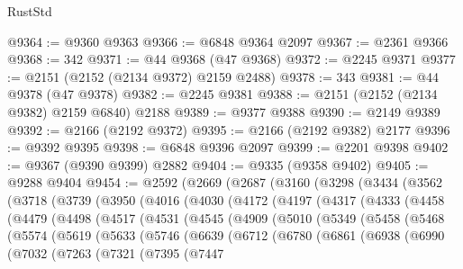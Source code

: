 \begin{lexlean}{RustStd}
\begin{coremodule}
@9364 := @9360 @9363
@9366 := @6848 @9364 @2097
@9367 := @2361 @9366
@9368 := 342
@9371 := @44 @9368 (@47 @9368)
@9372 := @2245 @9371
@9377 := @2151 (@2152 (@2134 @9372) @2159 @2488)
@9378 := 343
@9381 := @44 @9378 (@47 @9378)
@9382 := @2245 @9381
@9388 := @2151 (@2152 (@2134 @9382) @2159 @6840) @2188
@9389 := @9377 @9388
@9390 := @2149 @9389
@9392 := @2166 (@2192 @9372)
@9395 := @2166 (@2192 @9382) @2177
@9396 := @9392 @9395
@9398 := @6848 @9396 @2097
@9399 := @2201 @9398
@9402 := @9367 (@9390 @9399) @2882
@9404 := @9335 (@9358 @9402)
@9405 := @9288 @9404
@9454 := @2592
    (@2669
      (@2687
        (@3160
          (@3298
            (@3434
              (@3562
                (@3718
                  (@3739
                    (@3950
                      (@4016
                        (@4030
                          (@4172
                            (@4197
                              (@4317
                                (@4333
                                  (@4458
                                    (@4479
                                      (@4498
                                        (@4517
                                          (@4531
                                            (@4545
                                              (@4909
                                                (@5010
                                                  (@5349
                                                    (@5458
                                                      (@5468
                                                        (@5574
                                                          (@5619
                                                            (@5633
                                                              (@5746
                                                                (@6639
                                                                  (@6712
                                                                    (@6780
                                                                      (@6861
                                                                        (@6938
                                                                          (@6990
                                                                            (@7032
                                                                              (@7263
                                                                                (@7321
                                                                                  (@7395
                                                                                    (@7447

\end{coremodule}
\end{lexlean}
